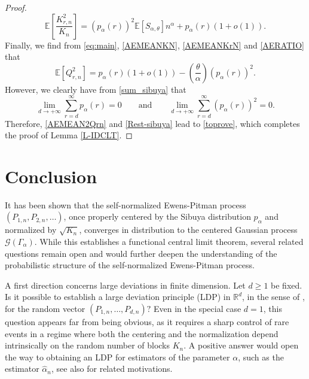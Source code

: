 \documentclass[twoside,12pt]{article}
\newcommand{\E}{\mathds{E}}
\begin{document}
\begin{proof}
\begin{equation}
\label{AERATIO}
\E\left[\frac{K_{r,n}^{2}}{K_{n}}\right]=(p_{\alpha}(r))^2 \E[S_{\alpha, \theta}] n^\alpha + p_{\alpha}(r)(1+o(1)).
\end{equation}
Finally, we find from \eqref{eq:main}, \eqref{AEMEANKN}, \eqref{AEMEANKrN} and \eqref{AERATIO} that
\begin{equation}
\label{AEMEAN2Qrn}
\E[Q_{r,n}^{2}]= p_{\alpha}(r)(1+o(1)) - \left(\frac{\theta}{\alpha}\right) (p_{\alpha}(r))^2.
\end{equation}
However, we clearly have from \eqref{sum_sibuya} that
\begin{equation}
\label{Rest-sibuya}
\lim_{d\rightarrow+\infty}\sum_{r=d}^\infty p_\alpha(r)=0 \qquad \text{and}
\qquad
\lim_{d\rightarrow+\infty}\sum_{r=d}^\infty (p_\alpha(r))^2=0.
\end{equation}
Therefore, \eqref{AEMEAN2Qrn} and \eqref{Rest-sibuya} lead to \eqref{toprove}, which completes the proof of Lemma \ref{L-IDCLT}. 
\end{proof}



\section{Conclusion}\label{sec3}

It has been shown that the self-normalized Ewens-Pitman process $(P_{1,n},P_{2,n},\ldots)$, once properly centered by the Sibuya distribution $p_\alpha$ and normalized by $\sqrt{K_n}$, converges in distribution to the centered Gaussian process $\mathcal{G}(\Gamma_\alpha)$. While this establishes a functional central limit theorem, several related questions remain open and would further deepen the understanding of the probabilistic structure of the self-normalized Ewens-Pitman process.

A first direction concerns large deviations in finite dimension. Let $d\geq 1$ be fixed. Is it possible to establish a large deviation principle (LDP) in $\mathbb{R}^d$, in the sense of \citet{Dem(98)}, for the random vector $(P_{1,n},\ldots,P_{d,n})?$ Even in the special case $d=1$, this question appears far from being obvious, as it requires a sharp control of rare events in a regime where both the
centering and the normalization depend intrinsically on the random number of blocks $K_n$. A positive answer would open the way to obtaining an LDP for estimators of the parameter $\alpha$, such as the estimator 
$\widehat{\alpha}_n$, see also \citet{Fen(98)} for related motivations.
\end{document}
